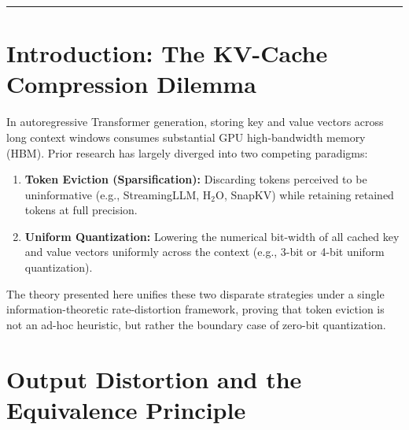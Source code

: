 

\tableofcontents
\vspace{1em}
\hrule
\vspace{1em}

\section{Introduction: The KV-Cache Compression Dilemma}
In autoregressive Transformer generation, storing key and value vectors across long context windows consumes substantial GPU high-bandwidth memory (HBM). Prior research has largely diverged into two competing paradigms:
\begin{enumerate}
    \item \textbf{Token Eviction (Sparsification):} Discarding tokens perceived to be uninformative (e.g., StreamingLLM, $\text{H}_2\text{O}$, SnapKV) while retaining retained tokens at full precision.
    \item \textbf{Uniform Quantization:} Lowering the numerical bit-width of all cached key and value vectors uniformly across the context (e.g., 3-bit or 4-bit uniform quantization).
\end{enumerate}
The theory presented here unifies these two disparate strategies under a single information-theoretic rate-distortion framework, proving that token eviction is not an ad-hoc heuristic, but rather the boundary case of zero-bit quantization.


\section{Output Distortion and the Equivalence Principle}

